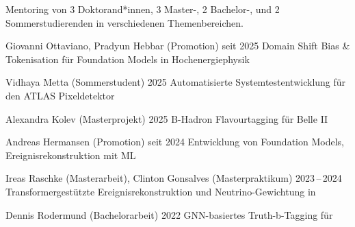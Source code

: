 
Mentoring von 3 Doktorand*innen, 3 Master-, 2 Bachelor-, und 2 Sommerstudierenden in verschiedenen Themenbereichen.

\begin{cvhonors}[1mm]
  \cvhonor
    {Giovanni Ottaviano, Pradyun Hebbar \textmd{(Promotion)}} %
    {} %
    {} %
    {seit 2025} %
    {Domain Shift Bias \& Tokenisation f\"ur Foundation Models in Hochenergiephysik}

  \cvhonor
    {Vidhaya Metta \textmd{(Sommerstudent)}} %
    {} %
    {} %
    {2025} %
    {Automatisierte Systemtestentwicklung f\"ur den ATLAS Pixeldetektor}

  \cvhonor
    {Alexandra Kolev \textmd{(Masterprojekt)}} %
    {} %
    {} %
    {2025} %
    {B-Hadron Flavourtagging f\"ur Belle II}

  \cvhonor
    {Andreas Hermansen \textmd{(Promotion)}} %
    {} %
    {} %
    {seit 2024} %
    {Entwicklung von Foundation Models, Ereignisrekonstruktion mit ML}

  \cvhonor
    {Ireas Raschke \textmd{(Masterarbeit)}, Clinton Gonsalves \textmd{(Masterpraktikum)}} %
    {} %
    {} %
    {2023\,--\,2024} %
    {Transformergest\"utzte Ereignisrekonstruktion und Neutrino-Gewichtung in \ttHWW}


  \cvhonor
    {Dennis Rodermund \textmd{(Bachelorarbeit)}} %
    {} %
    {} %
    {2022} %
    {GNN-basiertes Truth-b-Tagging f\"ur \ttHbb}


\end{cvhonors}
